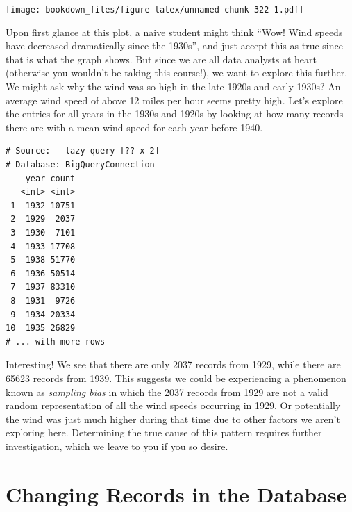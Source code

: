 \documentclass[]{krantz}
\makeatletter
\newenvironment{Shaded}{\begin{snugshade}}{\end{snugshade}}
\newcommand{\KeywordTok}[1]{\textcolor[rgb]{0.27,0.27,0.27}{\textbf{#1}}}
\newcommand{\DataTypeTok}[1]{\textcolor[rgb]{0.27,0.27,0.27}{#1}}
\newcommand{\DecValTok}[1]{\textcolor[rgb]{0.06,0.06,0.06}{#1}}
\newcommand{\StringTok}[1]{\textcolor[rgb]{0.5,0.5,0.5}{#1}}
\newcommand{\OperatorTok}[1]{\textcolor[rgb]{0.43,0.43,0.43}{\textbf{#1}}}
\newcommand{\NormalTok}[1]{#1}
\newenvironment{kframe}{%
\medskip{}
\setlength{\fboxsep}{.8em}
 \def\at@end@of@kframe{}%
 \ifinner\ifhmode%
  \def\at@end@of@kframe{\end{minipage}}%
  \begin{minipage}{\columnwidth}%
 \fi\fi%
 \def\FrameCommand##1{\hskip\@totalleftmargin \hskip-\fboxsep
 \colorbox{shadecolor}{##1}\hskip-\fboxsep
     \hskip-\linewidth \hskip-\@totalleftmargin \hskip\columnwidth}%
 \MakeFramed {\advance\hsize-\width
   \@totalleftmargin\z@ \linewidth\hsize
   \@setminipage}}%
 {\par\unskip\endMakeFramed%
 \at@end@of@kframe}
\renewenvironment{Shaded}{\begin{kframe}}{\end{kframe}}
\makeatother
\begin{document}
\texttt{[image: bookdown\_files/figure-latex/unnamed-chunk-322-1.pdf]}

Upon first glance at this plot, a naive student might think ``Wow! Wind
speeds have decreased dramatically since the 1930s'', and just accept
this as true since that is what the graph shows. But since we are all
data analysts at heart (otherwise you wouldn't be taking this course!),
we want to explore this further. We might ask why the wind was so high
in the late 1920s and early 1930s? An average wind speed of above 12
miles per hour seems pretty high. Let's explore the entries for all
years in the 1930s and 1920s by looking at how many records there are
with a mean wind speed for each year before 1940.

\begin{Shaded}
\end{Shaded}

\begin{verbatim}
# Source:   lazy query [?? x 2]
# Database: BigQueryConnection
    year count
   <int> <int>
 1  1932 10751
 2  1929  2037
 3  1930  7101
 4  1933 17708
 5  1938 51770
 6  1936 50514
 7  1937 83310
 8  1931  9726
 9  1934 20334
10  1935 26829
# ... with more rows
\end{verbatim}

Interesting! We see that there are only 2037 records from 1929, while
there are 65623 records from 1939. This suggests we could be
experiencing a phenomenon known as \emph{sampling bias} in which the
2037 records from 1929 are not a valid random representation of all the
wind speeds occurring in 1929. Or potentially the wind was just much
higher during that time due to other factors we aren't exploring here.
Determining the true cause of this pattern requires further
investigation, which we leave to you if you so desire.

\section{Changing Records in the
Database}\label{changing-records-in-the-database}
\end{document}
